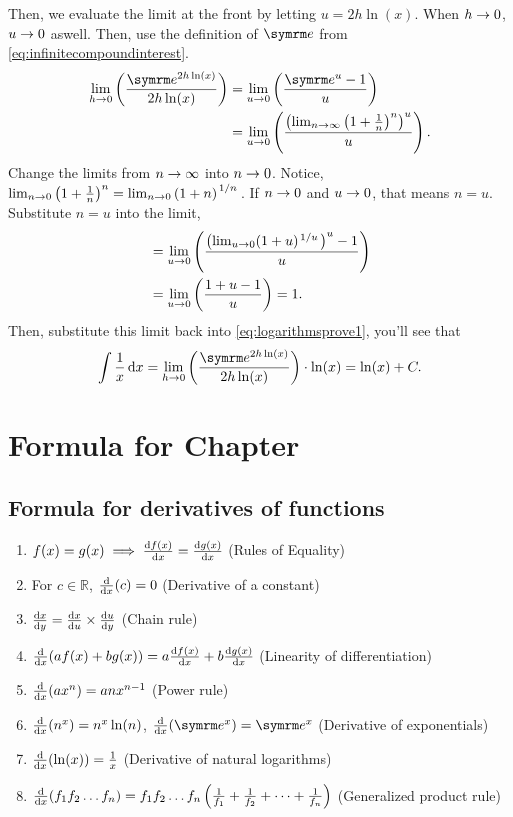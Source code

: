 Then, we evaluate the limit at the front by letting $u = 2h\ln(x)$. When $h \rightarrow 0$, $u \rightarrow 0$ aswell. Then, use the definition of $\e$ from \cref{eq:infinitecompoundinterest}.
\begin{align*}
    \lim_{h \appr 0}\left(\frac{\e^{2h\ln(x)}}{2h\ln(x)}\right) &= \lim_{u \appr 0}\left(\frac{\e^u - 1}{u}\right) \\
    &= \lim_{u \appr 0}\left(\frac{\left(\lim_{n \appr \infty}\left(1 + \frac{1}{n}\right)^n\right)^u}{u}\right).
\end{align*}
Change the limits from $n \rightarrow \infty$ into $n \rightarrow 0$. Notice, $\lim_{n \appr 0}\left(1 + \frac{1}{n}\right)^n = \lim_{n \appr 0}\left(1 + n\right)^{\flatfrac{1}{n}}$. If $n \rightarrow 0$ and $u \rightarrow 0$, that means $n = u$. Substitute $n = u$ into the limit,
\begin{align*}
    &= \lim_{u \appr 0}\left(\frac{\left(\lim_{u \appr 0}(1 + u)^{\flatfrac{1}{u}}\right)^u - 1}{u}\right) \\
    &= \lim_{u \appr 0}\left(\frac{1 + u - 1}{u}\right) = 1. \\
\end{align*}
Then, substitute this limit back into \cref{eq:logarithmsprove1}, you'll see that
\begin{equation*}
    \int\frac{1}{x}\dd{x} = \lim_{h \appr 0}\left(\frac{\e^{2h\ln(x)}}{2h\ln(x)}\right) \cdot \ln(x) = \ln(x) + C.
\end{equation*}

\section{Formula for Chapter \thechapter}

\everymath{\displaystyle}
\subsection{Formula for derivatives of functions}

\begin{enumerate}
    \item $f(x) = g(x) \implies \dv{f(x)}{x} = \dv{g(x)}{x}$ (Rules of Equality)
    \item For $c \in \mathbb{R}$, $\dv{x}(c) = 0$ (Derivative of a constant)
    \item $\dv{x}{y} = \dv{x}{u} \times \dv{u}{y}$ (Chain rule)
    \item $\dv{x}(af(x) + bg(x)) = a\dv{f(x)}{x} + b\dv{g(x)}{x}$ (Linearity of differentiation)
    \item $\dv{x}(ax^n) = anx^{n - 1}$ (Power rule)
    \item $\dv{x}(n^x) = n^x\ln(n)$, $\dv{x}(\e^x) = \e^x$ (Derivative of exponentials)
    \item $\dv{x}(\ln(x)) = \frac{1}{x}$ (Derivative of natural logarithms)
    \item $\dv{x}(f_1f_2\dots f_n) = f_1f_2\dots f_n\left(\frac{1}{f_1} + \frac{1}{f_2} + \dots + \frac{1}{f_n}\right)$ (Generalized product rule)
\end{enumerate}

